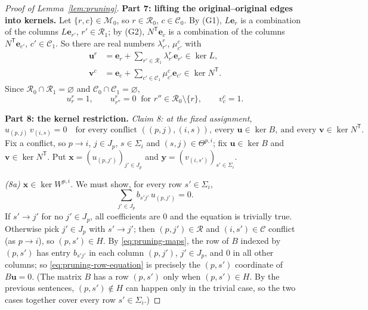 \documentclass[11pt]{article}
\theoremstyle{remark}
\newcommand{\Step}[1]{\par\medskip\noindent\textbf{#1}\enspace}
\newcommand{\tp}{^{\mathsf T}}
\newcommand{\cR}{\mathcal R}
\newcommand{\cC}{\mathcal C}
\newcommand{\cM}{\mathcal M}
\newcommand{\bu}{\mathbf u}
\newcommand{\bv}{\mathbf v}
\newcommand{\bx}{\mathbf x}
\newcommand{\by}{\mathbf y}
\newcommand{\be}{\mathbf e}
\begin{document}
\begin{proof}[Proof of Lemma~\ref{lem:pruning}]
\Step{Part 7: lifting the original--original edges into kernels.}
Let $\{r,c\}\in\cM_0$, so $r\in\cR_0$, $c\in\cC_0$. By (G1),
$L\be_r$ is a combination of the columns $L\be_{r'}$, $r'\in\cR_1$; by (G2),
$N\tp\be_c$ is a combination of the columns $N\tp\be_{c'}$, $c'\in\cC_1$.
So there are real numbers $\lambda^r_{r'}$, $\mu^c_{c'}$ with
\begin{equation}\label{eq:pruning-lifts}
 \begin{aligned}
 \bu^r&=\be_r+\sum_{r'\in \cR_1}\lambda_{r'}^r \be_{r'}
                 \in\ker L,\\
 \bv^c&=\be_c+\sum_{c'\in \cC_1}\mu_{c'}^c \be_{c'}
                 \in\ker N\tp.
 \end{aligned}
\end{equation}
Since $\cR_0\cap\cR_1=\varnothing$ and $\cC_0\cap\cC_1=\varnothing$,
\begin{equation}\label{eq:lift-coordinates}
 u^r_{r}=1,\qquad u^r_{r''}=0\ \text{ for }r''\in\cR_0\setminus\{r\},
 \qquad v^c_c=1 .
\end{equation}

\Step{Part 8: the kernel restriction.}
\emph{Claim 8: at the fixed assignment,}
\begin{equation}\label{eq:conflict-kernel}
 u_{(p,j)}\,v_{(i,s)}=0
 \quad\text{for every conflict }((p,j),(i,s)),
 \ \text{every }\bu\in\ker B,\ \text{and every }\bv\in\ker N\tp.
\end{equation}
Fix a conflict, so $p\to i$, $j\in J_p$, $s\in\Sigma_i$ and
$(s,j)\in\Theta^{p,i}$; fix $\bu\in\ker B$ and $\bv\in\ker N\tp$. Put
$\bx=(u_{(p,j')})_{j'\in J_p}$ and $\by=(v_{(i,s')})_{s'\in\Sigma_i}$.

\smallskip\noindent\emph{(8a) $\bx\in\ker W^{p,i}$.}
We must show, for every row $s'\in\Sigma_i$,
\begin{equation}\label{eq:pruning-row-equation}
 \sum_{j'\in J_p}b_{s'j'}\,u_{(p,j')}=0.
\end{equation}
If $s'\to j'$ for no $j'\in J_p$, all coefficients are $0$ and the equation
is trivially true. Otherwise pick $j'\in J_p$ with $s'\to j'$; then
$(p,j')\in\cR$ and $(i,s')\in\cC$ conflict (as $p\to i$), so $(p,s')\in H$.
By \eqref{eq:pruning-maps}, the row of $B$ indexed by $(p,s')$ has entry
$b_{s'j'}$ in each column $(p,j')$, $j'\in J_p$, and $0$ in all other
columns; so \eqref{eq:pruning-row-equation} is precisely the $(p,s')$
coordinate of $B\bu=0$. (The matrix $B$ has a row $(p,s')$ only when
$(p,s')\in H$. By the previous sentences, $(p,s')\notin H$ can happen only
in the trivial case, so the two cases together cover every row
$s'\in\Sigma_i$.)


\end{proof}
\end{document}
